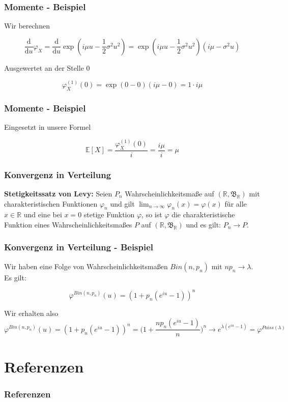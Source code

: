 \documentclass{beamer}
\newcommand{\R}{\mathbb{R}}
\newcommand{\E}{\mathbb{E}}
\newcommand\dint{\mathord{\mathrm{d}}}
\begin{document}
\begin{frame}
\frametitle{Momente - Beispiel}
Wir berechnen

$$\frac{\dint}{\dint u} \varphi_X = \frac{\dint}{\dint u} \exp(i \mu u - \frac{1}{2} \sigma^2 u^2) = \exp(i \mu u - \frac{1}{2} \sigma^2 u^2) (i \mu - \sigma^2 u)$$

Ausgewertet an der Stelle 0

$$\varphi_X^{(1)}(0) = \exp(0 - 0) (i \mu - 0) = 1 \cdot i \mu$$
\end{frame}

\begin{frame}
\frametitle{Momente - Beispiel}
Eingesetzt in unsere Formel

$$\E[X] = \frac{\varphi_X^{(1)}(0)}{i} = \frac{i \mu}{i} = \mu$$
\end{frame}

\begin{frame}
\frametitle{Konvergenz in Verteilung}
\textbf{Stetigkeitssatz von Levy:} \hfill \newline
Seien $P_n$ Wahrscheinlichkeitsmaße auf $(\R, \mathfrak{B}_\R)$ mit charakteristischen Funktionen $\varphi_n$ und gilt $\lim_{n \to \infty} \varphi_n (x) = \varphi(x)$ für alle $x \in \R$ und eine bei $x = 0$ stetige Funktion $\varphi$, so ist $\varphi$ die charakteristische Funktion eines Wahrscheinlichkeitsmaßes $P$ auf $(\R, \mathfrak{B}_\R)$ und es gilt: $P_n \to P$.
\end{frame}

\begin{frame}
\frametitle{Konvergenz in Verteilung - Beispiel}
Wir haben eine Folge von Wahrscheinlichkeitsmaßen $Bin(n, p_n)$ mit $np_n \to \lambda$. Es gilt:

$$\varphi^{Bin(n, p_n)}(u) = (1 + p_n(e^{iu} - 1))^n$$

Wir erhalten also
{\footnotesize
$$\varphi^{Bin(n, p_n)}(u) = (1 + p_n(e^{iu} - 1))^n = \Bigg(1 + \frac{np_n(e^{iu} - 1)}{n}\Bigg)^n \to e^{\lambda(e^{iu}-1)} = \varphi^{Poiss(\lambda)}$$
}%
\end{frame}



\section*{Referenzen}


\begin{frame}
\frametitle{Referenzen}
\nocite{*}
\printbibliography
\end{frame}
\end{document}
